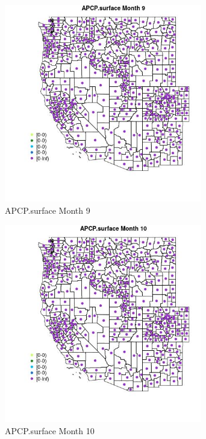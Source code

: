 \begin{figure} 
\centering  
\includegraphics[width=0.77\textwidth]{Code_Outputs/df_report_ML_predictors_CountyCentroid_Locations_Dates_2008-01-01to2018-12-31_MapObsMo9APCPsurface.jpg} 
\caption{\label{fig:df_report_ML_predictors_CountyCentroid_Locations_Dates_2008-01-01to2018-12-31MapObsMo9APCPsurface}APCP.surface Month 9} 
\end{figure} 
 

\clearpage 

\begin{figure} 
\centering  
\includegraphics[width=0.77\textwidth]{Code_Outputs/df_report_ML_predictors_CountyCentroid_Locations_Dates_2008-01-01to2018-12-31_MapObsMo10APCPsurface.jpg} 
\caption{\label{fig:df_report_ML_predictors_CountyCentroid_Locations_Dates_2008-01-01to2018-12-31MapObsMo10APCPsurface}APCP.surface Month 10} 
\end{figure} 
 

